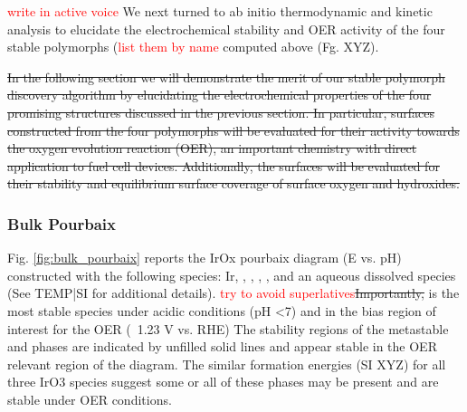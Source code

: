 

\textcolor{red}{write in active voice}
We next turned to ab initio thermodynamic and kinetic analysis to elucidate the electrochemical stability and OER activity of the four stable polymorphs (\textcolor{red}{list them by name} computed above (Fg. XYZ).


\sout{In the following section we will demonstrate the merit of our stable polymorph discovery algorithm by elucidating the electrochemical properties of the four promising structures discussed in the previous section.
%
In particular, surfaces constructed from the four polymorphs will be evaluated for their activity towards the oxygen evolution reaction (OER), an important chemistry with direct application to fuel cell devices.
%
Additionally, the surfaces will be evaluated for their stability and equilibrium surface coverage of surface oxygen and hydroxides.}



\subsubsection{Bulk Pourbaix}

Fig. \ref{fig:bulk_pourbaix} reports the IrOx pourbaix diagram (E vs. pH) constructed with the following species: Ir, \rIrOtwo, \aIrOthree,  \rIrOthree, \bIrOthree, and an aqueous dissolved  species (See TEMP|SI for additional details).
%
%
\textcolor{red}{try to avoid superlatives}\sout{Importantly,} 
\aIrOthree is the most stable species under acidic conditions (pH \textless 7) and in the bias region of interest for the OER (~1.23 V vs. RHE)
%
%
The stability regions of the metastable \rIrOthree and \bIrOthree phases are indicated by unfilled solid lines and appear stable in the OER relevant region of the diagram.
The similar formation energies (SI XYZ) for all three IrO3 species suggest some or all of these  phases may be present and are stable under OER conditions.

